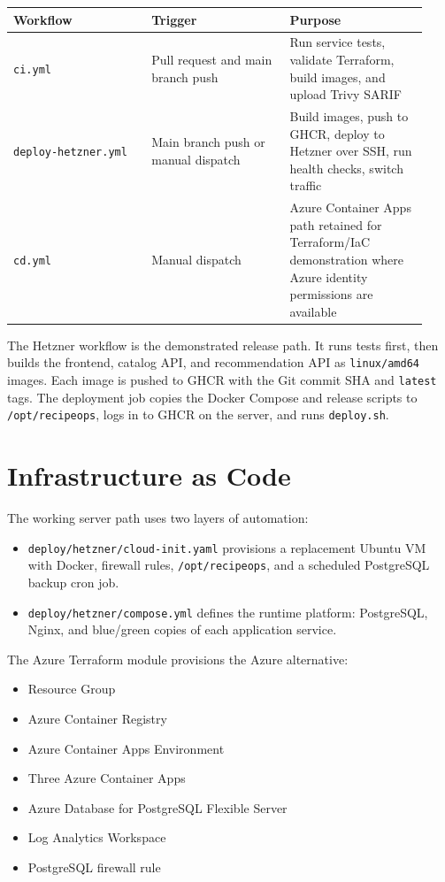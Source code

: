 \documentclass[11pt,a4paper]{article}
\begin{document}
\begin{longtable}{@{}>{\raggedright\arraybackslash}p{0.31\linewidth}>{\raggedright\arraybackslash}p{0.31\linewidth}>{\raggedright\arraybackslash}p{0.31\linewidth}@{}}
\toprule
\textbf{Workflow} & \textbf{Trigger} & \textbf{Purpose} \\
\midrule
\endhead
\texttt{ci.yml} & Pull request and main branch push & Run service tests, validate Terraform, build images, and upload Trivy SARIF \\
\texttt{deploy-hetzner.yml} & Main branch push or manual dispatch & Build images, push to GHCR, deploy to Hetzner over SSH, run health checks, switch traffic \\
\texttt{cd.yml} & Manual dispatch & Azure Container Apps path retained for Terraform/IaC demonstration where Azure identity permissions are available \\
\bottomrule
\end{longtable}

The Hetzner workflow is the demonstrated release path. It runs tests first, then builds the frontend, catalog API, and recommendation API as \texttt{linux/amd64} images. Each image is pushed to GHCR with the Git commit SHA and \texttt{latest} tags. The deployment job copies the Docker Compose and release scripts to \texttt{/opt/recipeops}, logs in to GHCR on the server, and runs \texttt{deploy.sh}.

\section{Infrastructure as Code}

The working server path uses two layers of automation:

\begin{itemize}
\item \texttt{deploy/hetzner/cloud-init.yaml} provisions a replacement Ubuntu VM with Docker, firewall rules, \texttt{/opt/recipeops}, and a scheduled PostgreSQL backup cron job.
\item \texttt{deploy/hetzner/compose.yml} defines the runtime platform: PostgreSQL, Nginx, and blue/green copies of each application service.
\end{itemize}

The Azure Terraform module provisions the Azure alternative:

\begin{itemize}
\item Resource Group
\item Azure Container Registry
\item Azure Container Apps Environment
\item Three Azure Container Apps
\item Azure Database for PostgreSQL Flexible Server
\item Log Analytics Workspace
\item PostgreSQL firewall rule
\end{itemize}
\end{document}
